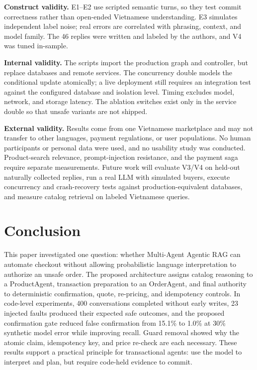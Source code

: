 \documentclass{IEEEtran}
\begin{document}
\textbf{Construct validity.} E1--E2 use scripted semantic turns, so they test commit correctness rather than open-ended Vietnamese understanding. E3 simulates independent label noise; real errors are correlated with phrasing, context, and model family. The 46 replies were written and labeled by the authors, and V4 was tuned in-sample.

\textbf{Internal validity.} The scripts import the production graph and controller, but replace databases and remote services. The concurrency double models the conditional update atomically; a live deployment still requires an integration test against the configured database and isolation level. Timing excludes model, network, and storage latency. The ablation switches exist only in the service double so that unsafe variants are not shipped.

\textbf{External validity.} Results come from one Vietnamese marketplace and may not transfer to other languages, payment regulations, or user populations. No human participants or personal data were used, and no usability study was conducted. Product-search relevance, prompt-injection resistance, and the payment saga require separate measurements. Future work will evaluate V3/V4 on held-out naturally collected replies, run a real LLM with simulated buyers, execute concurrency and crash-recovery tests against production-equivalent databases, and measure catalog retrieval on labeled Vietnamese queries.

\section{Conclusion}

This paper investigated one question: whether Multi-Agent Agentic RAG can automate checkout without allowing probabilistic language interpretation to authorize an unsafe order. The proposed architecture assigns catalog reasoning to a ProductAgent, transaction preparation to an OrderAgent, and final authority to deterministic confirmation, quote, re-pricing, and idempotency controls. In code-level experiments, 400 conversations completed without early writes, 23 injected faults produced their expected safe outcomes, and the proposed confirmation gate reduced false confirmation from 15.1\% to 1.0\% at 30\% synthetic model error while improving recall. Guard removal showed why the atomic claim, idempotency key, and price re-check are each necessary. These results support a practical principle for transactional agents: use the model to interpret and plan, but require code-held evidence to commit.
\end{document}
